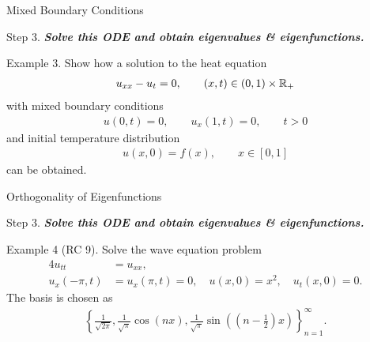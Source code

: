 \documentclass[hyperref={pdfpagelabels=true}]{beamer}
\newcommand{\highlightg}[1]{\textcolor[rgb]{0.1,0.5,0.3}{\emph{\textbf{#1}}}}
\newcommand{\structb}[1]{\textcolor[rgb]{0.2,0.2,0.7}{#1}}
\begin{document}
\begin{frame}{Mixed Boundary Conditions}

\justifying
\begin{block}{}
	\justifying
	\structb{Step 3.} \highlightg{Solve this ODE and obtain eigenvalues \& eigenfunctions.}
\end{block}
\begin{block}{}
	\structb{Example 3.} Show how a solution to the heat equation
	\begin{align*}
	u_{xx} - u_t = 0, \qquad (x, t)\in (0, 1)\times \mathbb{R}_{+}
	\end{align*}
	with mixed boundary conditions
	\begin{align*}
	u(0, t) = 0,\qquad u_x(1, t) = 0, \qquad t>0
	\end{align*}
	and initial temperature distribution
	\begin{align*}
	u(x, 0) = f(x), \qquad x\in [0, 1]
	\end{align*}
	can be obtained.
\end{block}


\end{frame}





\begin{frame}{Orthogonality of Eigenfunctions}

\begin{block}{}
	\justifying
	\structb{Step 3.} \highlightg{Solve this ODE and obtain eigenvalues \& eigenfunctions.}
\end{block}
\begin{block}{}
	\structb{Example 4 (RC 9).} Solve the wave equation problem
	\begin{align*}
	4u_{tt} & = u_{xx}, \\
	u_x(-\pi, t) & = u_x(\pi, t) = 0, \quad u(x, 0) = x^2, \quad u_t(x, 0) = 0.
	\end{align*}
	The basis is chosen as
	\begin{align*}
	\left\{\frac{1}{\sqrt{2\pi}}, \frac{1}{\sqrt{\pi}}\cos(nx), \frac{1}{\sqrt{\pi}}\sin\left(\left(n - \frac{1}{2} \right)x \right) \right\}_{n=1}^{\infty}.
	\end{align*}
\end{block}


\end{frame}
\end{document}
